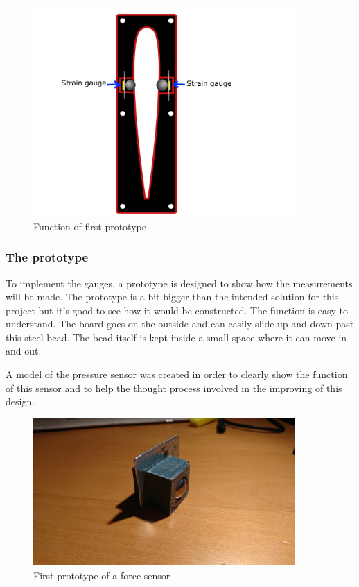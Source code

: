 \begin{figure}[H]
\begin{center}
	\includegraphics[width = 10cm]{Figures/Prototyp_1.png}
	\caption{Function of first prototype}
	\label{Press_sens_impl}
\end{center}
\end{figure}

\subsubsection{The prototype}
To implement the gauges, a prototype is designed to show how the measurements will be made. The prototype is a bit bigger than the intended solution for this project but it's good to see how it would be constructed. The function is easy to understand. The board goes on the outside and can easily slide up and down past this steel bead. The bead itself is kept inside a small space where it can move in and out.

A model of the pressure sensor was created in order to clearly show the function of this sensor and to help the thought process involved in the improving of this design.

\begin{figure}[H]
\begin{center}
	\includegraphics[width = 10cm]{Figures/Press_sens_prot_1.png}
	\caption{First prototype of a force sensor}
	\label{Press_sens_prot_1}
\end{center}
\end{figure}

